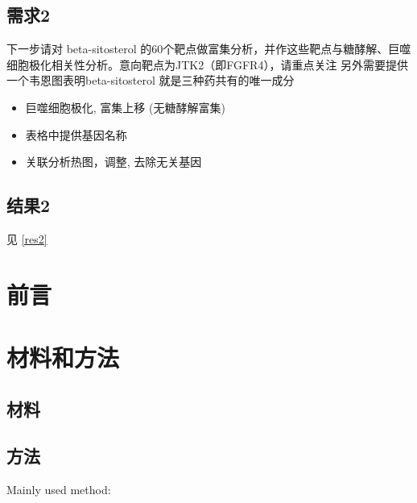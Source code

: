 \documentclass[
]{article}
\providecommand{\tightlist}{%
  \setlength{\itemsep}{0pt}\setlength{\parskip}{0pt}}
\begin{document}
\hypertarget{ux9700ux6c422}{%
\subsection{需求2}\label{ux9700ux6c422}}

下一步请对 beta-sitosterol 的60个靶点做富集分析，并作这些靶点与糖酵解、巨噬细胞极化相关性分析。意向靶点为JTK2（即FGFR4），请重点关注
另外需要提供一个韦恩图表明beta-sitosterol 就是三种药共有的唯一成分

\begin{itemize}
\tightlist
\item
  巨噬细胞极化, 富集上移 (无糖酵解富集)
\item
  表格中提供基因名称
\item
  关联分析热图，调整, 去除无关基因
\end{itemize}

\hypertarget{ux7ed3ux679c2}{%
\subsection{结果2}\label{ux7ed3ux679c2}}

见 \ref{res2}

\hypertarget{introduction}{%
\section{前言}\label{introduction}}

\hypertarget{methods}{%
\section{材料和方法}\label{methods}}

\hypertarget{ux6750ux6599}{%
\subsection{材料}\label{ux6750ux6599}}

\hypertarget{ux65b9ux6cd5}{%
\subsection{方法}\label{ux65b9ux6cd5}}

Mainly used method:
\end{document}

